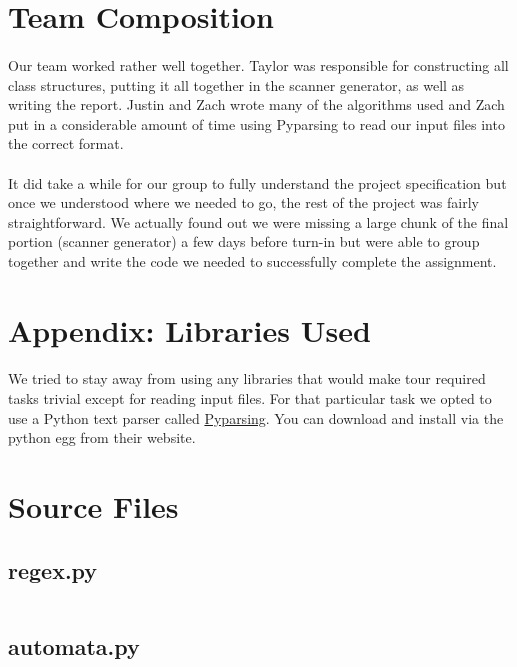 \documentclass{article}
\begin{document}
\section{Team Composition}
\paragraph{}Our team worked rather well together. Taylor was 
responsible for constructing all class structures, putting it all
together in the scanner generator, as well as writing the
report. Justin and Zach wrote many of the algorithms used and Zach put
in a considerable amount of time using Pyparsing to read our input
files into the correct format.

\paragraph{}It did take a while for our group to fully understand the
project specification but once we understood where we needed to go,
the rest of the project was fairly straightforward. We actually found
out we were missing a large chunk of the final portion (scanner
generator) a few days before turn-in but were able to group together
and write the code we needed to successfully complete the assignment.

\section{Appendix: Libraries Used}
\paragraph{} We tried to stay away from using any libraries that would make
tour required tasks trivial except for reading input files. For that
particular task we opted to use a Python text parser called
\href{http://pyparsing.wikispaces.com/}{Pyparsing}. You can download
and install via the python egg from their website.

\section{Source Files}
\label{code}
\subsection{regex.py}
\label{code:regex}
\inputminted{python}{./regex.py}

\subsection{automata.py}
\label{code:automata}
\inputminted{python}{./automata.py}
\end{document}
